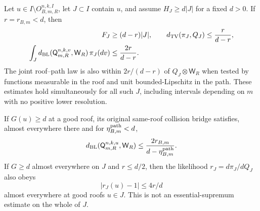 \begin{corollary}
\label{cor:v56-interval-posteriors}
Let $u\in I\setminus O_{B,m,R}^{n,k,I}$, let $J\subset I$
contain $u$, and assume $H_J\ge d|J|$ for a fixed $d>0$.
If $r=r_{B,m}<d$, then
\begin{align}
 F_J&\ge(d-r)|J|,\qquad
 d_{\rm TV}(\pi_J,Q_J)\le\frac{r}{d-r},
                                      \label{eq:v56-window-TV}\\
 \int_Jd_{\rm BL}(\mathsf Q^{n,k,v}_{m,R},\mathsf W_R)
                   \,\pi_J(dv)&\le\frac{2r}{d-r}.
                                      \label{eq:v56-window-path}
\end{align}
The joint roof--path law is also within $2r/(d-r)$ of
$Q_J\otimes\mathsf W_R$ when tested by functions measurable in
the roof and unit bounded-Lipschitz in the path. These estimates
hold simultaneously for all such $J$, including intervals depending
on $m$ with no positive lower resolution.

If $G(u)\ge d$ at a good roof, its original same-roof collision
bridge satisfies, almost everywhere there and for
$\eta^{\rm path}_{B,m}<d$,
\begin{equation}\label{eq:v56-good-roof-bridge}
 d_{\rm BL}(\mathsf Q^{n,k,u}_{m,R},\mathsf W_R)
                 \le\frac{2r_{B,m}}{d-\eta^{\rm path}_{B,m}}.
\end{equation}
If $G\ge d$ almost everywhere on $J$ and $r\le d/2$, then the
likelihood $r_J=d\pi_J/dQ_J$ also obeys
\begin{equation}\label{eq:v56-good-roof-likelihood}
 |r_J(u)-1|\le4r/d
\end{equation}
almost everywhere at good roofs $u\in J$. This is not an
essential-supremum estimate on the whole of $J$.
\end{corollary}
